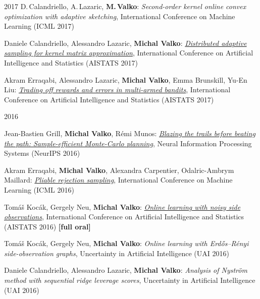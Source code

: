 \documentclass{resume}
\begin{document}
\begin{category}{2017}
\citembullet
D.\,Calandriello, A.\,Lazaric, {\bf M.\,Valko}:
\emph{Second-order kernel online convex optimization with adaptive sketching},
International Conference on Machine Learning
({\sf ICML 2017}) 

\citembullet
Daniele Calandriello, Alessandro Lazaric, {\bf Michal Valko}:
\href{http://researchers.lille.inria.fr/~valko/hp/serve.php?what=publications/calandriello2017distributed.pdf}
{\emph{Distributed adaptive sampling for kernel matrix approximation}},
International Conference on Artificial Intelligence and Statistics
({\sf AISTATS 2017}) 

\citembullet
Akram Erraqabi, Alessandro Lazaric, {\bf Michal Valko}, Emma Brunskill, Yu-En Liu:
\href{http://researchers.lille.inria.fr/~valko/hp/serve.php?what=publications/erraqabi2017trading.pdf}
{\emph{Trading off rewards and errors in multi-armed bandits}},
International Conference on Artificial Intelligence and Statistics
({\sf AISTATS 2017}) 

\end{category}\begin{category}{2016}

\citembullet
Jean-Bastien Grill, {\bf Michal Valko}, R\' emi Munos:
\href{http://researchers.lille.inria.fr/~valko/hp/serve.php?what=publications/grill2016blazing.pdf}
{\emph{Blazing the trails before beating the path: Sample-efficient Monte-Carlo planning}},
Neural Information Processing Systems
({\sf NeurIPS 2016}) 

\citembullet
Akram Erraqabi,  {\bf Michal Valko}, Alexandra Carpentier, Odalric-Ambrym Maillard:
\href{http://researchers.lille.inria.fr/~valko/hp/serve.php?what=publications/erraqabi2016pliable.pdf}
{\emph{Pliable rejection sampling}},
International Conference on Machine Learning
({\sf ICML 2016}) 

\citembullet
Tom\'a\v s Koc\' ak, Gergely Neu, {\bf Michal Valko}:
\href{http://researchers.lille.inria.fr/~valko/hp/serve.php?what=publications/kocak2016online.pdf}
{\emph{Online learning with noisy side observations}},
International Conference on Artificial Intelligence and Statistics
({\sf AISTATS 2016}) {\bf [full oral]}

\citembullet
Tom\'a\v s Koc\' ak, Gergely Neu, {\bf Michal Valko}:
\emph{ Online learning with Erd\H os--R\'enyi side-observation graphs},
Uncertainty in Artificial Intelligence
({\sf UAI 2016}) 

\citembullet
Daniele Calandriello, Alessandro Lazaric, {\bf Michal Valko}:
\emph{Analysis of Nystr{\"o}m method with sequential ridge leverage scores},
Uncertainty in Artificial Intelligence
({\sf UAI 2016}) 


\end{category}
\end{document}
